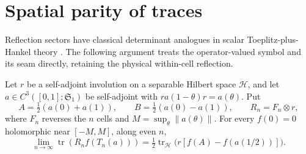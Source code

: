 \section{Spatial parity of traces}\label{v11:sec:parity-limits}

Reflection sectors have classical determinant analogues in scalar
Toeplitz-plus-Hankel theory \cite[Sections~2--3]{BasorEhrhardt2002}.
The following argument treats the operator-valued symbol and its seam
directly, retaining the physical within-cell reflection.

\begin{lemma}
\label{ext:lem:reflected-toeplitz}
Let $r$ be a self-adjoint involution on a separable Hilbert space
$\mathscr H$, and let $a\in C^3([0,1];\mathfrak S_1)$ be self-adjoint
with $ra(1-\theta)r=a(\theta)$.  Put
\[
 A=\tfrac12(a(0)+a(1)),\qquad B=\tfrac12(a(0)-a(1)),
 \qquad R_n=F_n\otimes r,
\]
where $F_n$ reverses the $n$ cells and $M=\sup_\theta\|a(\theta)\|$.
For every $f(0)=0$ holomorphic near $[-M,M]$, along even $n$,
\begin{equation}\label{ext:eq:reflected-toeplitz}
 \lim_{n\to\infty}\operatorname{tr}(R_nf(T_n(a)))
 =\tfrac12\operatorname{tr}_{\mathscr H}
       \bigl(r[f(A)-f(a(1/2))]\bigr).
\end{equation}
\end{lemma}

